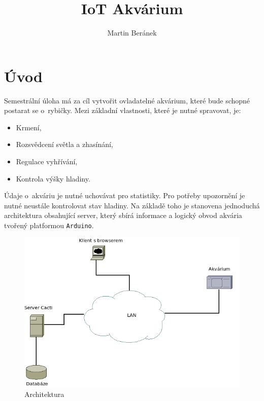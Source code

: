 \documentclass[a4paper,10pt]{article}
\begin{document}
\title{IoT Akvárium}
\author{Martin Beránek}
\maketitle

\tableofcontents
\listoffigures
\listoftables

\section{Úvod}

Semestrální úloha má za cíl vytvořit ovladatelné akvárium, které bude schopné postarat se o~rybičky. Mezi základní vlastnosti\label{vlastn}, které je nutné spravovat, je:

\begin{itemize}
	\item Krmení,
	\item Rozsvědcení světla a zhasínání,
	\item Regulace vyhřívání,
	\item Kontrola výšky hladiny.
\end{itemize}

Údaje o~akváriu je nutné uchovávat pro statistiky. Pro potřeby upozornění je nutné neustále kontrolovat stav hladiny. Na základě toho je stanovena jednoduchá architektura obsahující server, který sbírá informace a logický obvod akvária tvořený platformou \texttt{Arduino}.

\begin{figure}[H]
  \centering
    \includegraphics[width=1\textwidth]{net.png}
  \caption{Architektura}
  \label{char:arch}
\end{figure}
\end{document}
